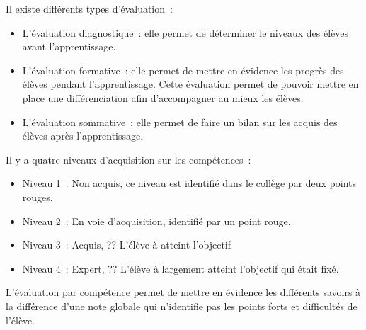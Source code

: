 
Il existe différents types d'évaluation~:
\begin{itemize}
\item L'évaluation diagnostique~: elle permet de déterminer le niveaux des élèves avant l'apprentissage.
\item L'évaluation formative~: elle permet de mettre en évidence les progrès des élèves pendant l'apprentissage. Cette évaluation permet de pouvoir mettre en place une différenciation afin d'accompagner au mieux les élèves.
\item L'évaluation sommative~: elle permet de faire un bilan sur les acquis des élèves après l'apprentissage.
\end{itemize}


Il y a quatre niveaux d'acquisition sur les compétences~:
\begin{itemize}
\item Niveau 1~: Non acquis, ce niveau est identifié dans le collège par deux points rouges.
\item Niveau 2~: En voie d'acquisition, identifié par un point rouge.
\item Niveau 3~: Acquis, ?? L'élève à atteint l'objectif
\item Niveau 4~: Expert, ?? L'élève à largement atteint l'objectif qui était fixé.
\end{itemize}


L'évaluation par compétence permet de mettre en évidence les différents savoirs à la différence d'une note globale qui n'identifie pas les points forts et difficultés de l'élève.
